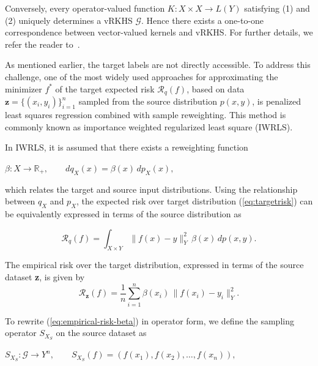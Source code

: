 \documentclass[twoside,11pt]{article}
\begin{document}
\noindent
Conversely, every operator-valued function 
$K : X \times X \to {L}(Y)$ satisfying (1) and (2) uniquely determines a 
vRKHS $\mathcal{G}$. Hence there exists a one-to-one correspondence between vector-valued kernels and vRKHS. For further details, we refer the reader to~\cite{one-one}. 

\vspace{0.5em}
\noindent

As mentioned earlier, the target labels are not directly accessible. To address this challenge, one of the most widely used approaches for approximating the minimizer $f^*$ of the target expected risk $\mathcal{R}_q(f)$, based on data $\mathbf{z} = \{(x_i, y_i)\}_{i=1}^n$ sampled from the source distribution $p(x,y)$, is penalized least squares regression combined with sample reweighting. This method is commonly known as importance weighted regularized least square (IWRLS).


\vspace{0.4em}
In IWRLS, it is assumed 
that there exists a  reweighting function  
\begin{center}
    
$\beta : {X} \to \mathbb{R}_+, 
\qquad 
dq_X(x) = \beta(x)\, dp_X(x),
$
\end{center}

\noindent
which relates the target and source input distributions.
Using the relationship between $q_X$ and $p_X$, the expected risk over target distribution (\ref{eq:targetrisk}) can be equivalently 
expressed in terms of the source distribution as

\[
\mathcal{R}_q(f) 
= \int_{X \times Y} \big\|f(x)-y\big\|_Y^2 \, \beta(x)\, dp(x,y).
\]


\medskip
\noindent
The empirical risk over the target distribution, expressed in terms of the source dataset \textbf{z}, is given by
\begin{equation} \label{eq:empirical-risk-beta}
\mathcal R_\mathbf{z}(f) 
= \frac{1}{n} \sum_{i=1}^n \beta(x_i)\, \big\| f(x_i) - y_i \big\|_{Y}^2.
\end{equation}


\noindent
To rewrite (\ref{eq:empirical-risk-beta}) in operator form, 
we define the sampling operator $S_{X_S}$ on the source dataset as


\begin{center}
    
$S_{X_S} : \mathcal{G} \longrightarrow Y^n, 
\qquad 
S_{X_S}(f) = \left(f(x_1), f(x_2), \ldots, f(x_n)\right),$
\end{center}
\end{document}
